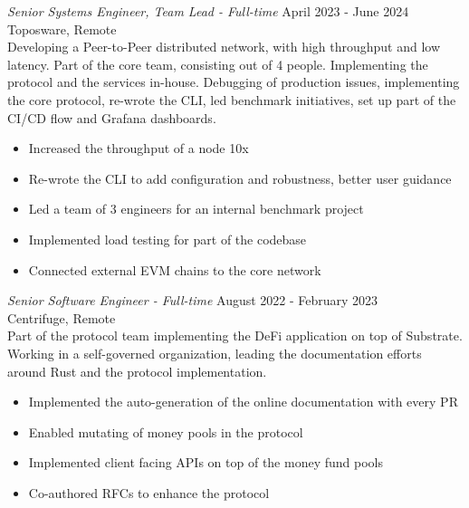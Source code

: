 \documentclass[10pt]{res} %
\begin{document}
\begin{resume}
{\sl Senior Systems Engineer, Team Lead - Full-time} \hfill April 2023 - June 2024 \\
Toposware, Remote \\
Developing a Peer-to-Peer distributed network, with high throughput and low latency. Part of the core team, consisting out of 4 people. Implementing the protocol and the services in-house. Debugging of production issues, implementing the core protocol, re-wrote the CLI, led benchmark initiatives, set up part of the CI/CD flow and Grafana dashboards.
\begin{itemize} \itemsep -2pt %
\item Increased the throughput of a node 10x 
\item Re-wrote the CLI to add configuration and robustness, better user guidance
\item Led a team of 3 engineers for an internal benchmark project
\item Implemented load testing for part of the codebase 
\item Connected external EVM chains to the core network
\end{itemize}

{\sl Senior Software Engineer - Full-time} \hfill August 2022 - February 2023 \\
Centrifuge, Remote \\
Part of the protocol team implementing the DeFi application on top of Substrate. Working in a self-governed organization, leading the documentation efforts around Rust and the protocol implementation.
\begin{itemize} \itemsep -2pt %
\item Implemented the auto-generation of the online documentation with every PR
\item Enabled mutating of money pools in the protocol
\item Implemented client facing APIs on top of the money fund pools
\item Co-authored RFCs to enhance the protocol 
\end{itemize}


\end{resume}
\end{document}
